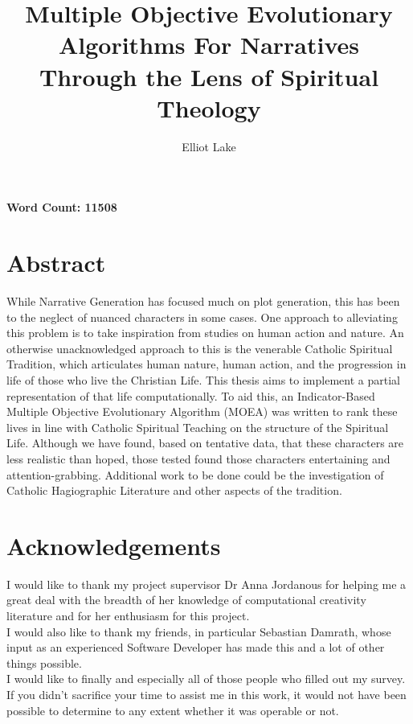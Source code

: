 \documentclass[11pt]{article}
\author{Elliot Lake}
\title{Multiple Objective Evolutionary Algorithms For Narratives Through the Lens of Spiritual Theology}
\begin{document}
\maketitle
\textbf{Word Count: 11508}
\pagebreak 
\section{Abstract}
While Narrative Generation has focused much on plot generation, this has been to the neglect of nuanced characters in some cases. One approach to alleviating this problem is to take inspiration from studies on human action and nature. An otherwise unacknowledged approach to this is the venerable Catholic Spiritual Tradition, which articulates human nature, human action, and the progression in life of those who live the Christian Life. This thesis aims to implement a partial representation of that life computationally. To aid this, an Indicator-Based Multiple Objective Evolutionary Algorithm (MOEA) was written to rank these lives in line with Catholic Spiritual Teaching on the structure of the Spiritual Life. Although we have found, based on tentative data, that these characters are less realistic than hoped, those tested found those characters entertaining and attention-grabbing. Additional work to be done could be the investigation of Catholic Hagiographic Literature and other aspects of the tradition.
\section{Acknowledgements}
I would like to thank my project supervisor Dr Anna Jordanous for helping me a great deal with the breadth of her knowledge of computational creativity literature and for her enthusiasm for this project.\\
I would also like to thank my friends, in particular Sebastian Damrath, whose input as an experienced Software Developer has made this and a lot of other things possible.\\
I would like to finally and especially all of those people who filled out my survey. If you didn't sacrifice your time to assist me in this work, it would not have been possible to determine to any extent whether it was operable or not. 
\pagebreak
\tableofcontents
\end{document}
